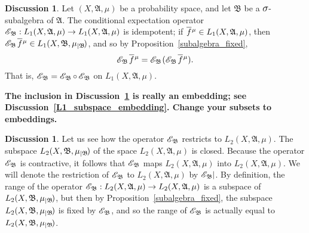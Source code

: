 \documentclass[
twoside=true,
paper=letter,
fontsize=11pt,
pagesize=auto,
leqno,
openany,
headsepline,
overfullrule,
]{scrbook}
\theoremstyle{plain}
\theoremstyle{plain}
\theoremstyle{definition}
\newtheorem{discussion}[thm]{Discussion}
\theoremstyle{bfnoteitalic}
\theoremstyle{bfnoteroman}
\newcommand{\sigalg}[1]{\mathfrak{#1}}
\newcommand{\cali}[1]{\mathscr{#1}}
\newcommand{\condexpsub}[2]
{\mathop{\cali{E}\hspace{-1.5pt}}\nolimits_{#2}\hspace{-1pt}#1}
\newcommand{\condexpop}[1]{\mathop{\cali{E}\hspace{-1pt}}\nolimits_{#1}}
\newcommand{\textsigma}{\hbox{\large{$\sigma$}}\kern-1pt}
\newcommand{\restrictedto}[1]{_{\lvert#1}\kern-1.5pt}
\newcommand{\sigmaalgebra}{\sigalg{A}}
\newcommand{\sigmaalgebraii}{\sigalg{B}}
\newcommand{\function}{f}
\newcommand{\measurespace}{X}
\newcommand{\measure}{\mu}
\newcommand*\xbar[1]{%
   \hbox{%
     \vbox{%
       \hrule height 0.4pt %
       \kern0.4ex%
       \hbox{%
         \ensuremath{#1}%
       }%
     }%
   }%
}
\newcommand{\lebclass}[1]{\hspace{.5pt}\xbar{#1}\hspace{0.5pt}}
\newcommand{\ellclass}[2]{\lebclass{#1}^{#2}}
\begin{document}
%
\begin{discussion}
Let $(\measurespace, \sigmaalgebra,\measure)$ be a  probability space, and let 
$\sigmaalgebraii$ be a $\textsigma$-subalgebra of $\sigmaalgebra$.
The conditional expectation operator
$
\condexpop{\sigmaalgebraii}:
L_1 (\measurespace, \sigmaalgebra,\measure)\to
L_1 (\measurespace, \sigmaalgebra,\measure)
$
is idempotent; if $\ellclass{\function}{\measure}\in L_1(\measurespace, \sigmaalgebra,\measure)$, then $\condexpsub{\ellclass{\function}{\measure}}{\sigmaalgebraii}\in 
L_1(\measurespace, \sigmaalgebraii,\measure\restrictedto{\sigmaalgebraii})$, and so by Proposition~\ref{subalgebra_fixed}, 
\[
\condexpsub{\ellclass{\function}{\measure}}{\sigmaalgebraii}
=
\condexpsub{{(\condexpsub{\ellclass{\function}{\measure}}{\sigmaalgebraii}})}
{\sigmaalgebraii}.
\]
That is, 
$\condexpop{\sigmaalgebraii} = 
\condexpop{\sigmaalgebraii}\circ\condexpop{\sigmaalgebraii}$
on $L_1 (\measurespace, \sigmaalgebra,\measure)$.
\end{discussion}

\textbf{The inclusion in Discussion~\ref{not_a_subspace} is really an embedding;
see Discussion~\ref{L1_subspace_embedding}.
Change your subsets to embeddings.}


\begin{discussion}\label{not_a_subspace}
Let us see how the operator
$\condexpop{\sigmaalgebraii}$ restricts to 
$L_2(\measurespace, \sigmaalgebra,\measure)$.
The subspace
$L_2(\measurespace, \sigmaalgebraii,\measure\restrictedto{\sigmaalgebraii})$
of the  space
$L_2(\measurespace, \sigmaalgebra,\measure)$ is closed.
Because the operator $\condexpop{\sigmaalgebraii}$ is contractive, it follows that 
$\condexpop{\sigmaalgebraii}$ maps
$L_2(\measurespace, \sigmaalgebra,\measure)$ 
into
$L_2(\measurespace, \sigmaalgebra,\measure)$.
We will denote the restriction of $\condexpop{\sigmaalgebraii}$ to 
$L_2(\measurespace, \sigmaalgebra,\measure)$ by 
$\condexpop{\sigmaalgebraii}\kern-2pt\vert$.
By definition, the range of the operator
$\condexpop{\sigmaalgebraii}:
L_2(\measurespace, \sigmaalgebra,\measure)
\to
L_2(\measurespace, \sigmaalgebra,\measure)$
is a subspace of 
$L_2(\measurespace, \sigmaalgebraii,\measure\restrictedto{\sigmaalgebraii})$,
but then by Proposition~\ref{subalgebra_fixed}, the subspace 
$L_2(\measurespace, \sigmaalgebraii,\measure\restrictedto{\sigmaalgebraii})$
is fixed by 
$\condexpop{\sigmaalgebraii}$, and so the range of 
$\condexpop{\sigmaalgebraii}$
is actually equal to 
$L_2(\measurespace, \sigmaalgebraii,\measure\restrictedto{\sigmaalgebraii})$.
\end{discussion}
\end{document}

